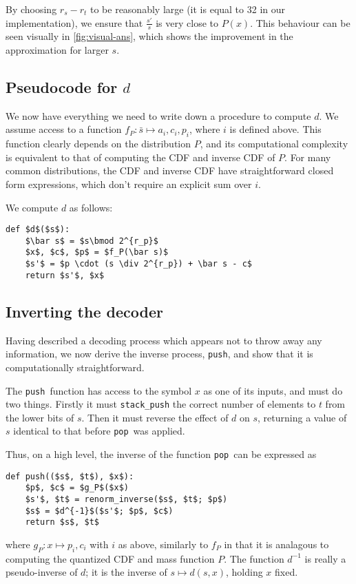 \documentclass{article}
\newcommand{\push}{\texttt{push}}
\newcommand{\pop}{\texttt{pop}}
\begin{document}
By choosing $r_s - r_t$ to be reasonably
large (it is equal to 32 in our implementation), we ensure that
$\frac{s'}{s}$ is very close to $P(x)$. This behaviour can be seen visually in
\cref{fig:visual-ans}, which shows the improvement in the approximation for
larger $s$.

\subsection{Pseudocode for $d$}
We now have everything we need to write down a procedure to compute $d$. We
assume access to a function $f_P:\bar{s}\mapsto a_i, c_i, p_i$, where $i$ is
defined above. This function clearly depends on the distribution $P$, and its
computational complexity is equivalent to that of computing the CDF and inverse
CDF of $P$. For many common distributions, the CDF and inverse CDF have
straightforward closed form expressions, which don't require an explicit sum
over $i$.

We compute $d$ as follows:
\begin{lstlisting}
def $d$($s$):
    $\bar s$ = $s\bmod 2^{r_p}$
    $x$, $c$, $p$ = $f_P(\bar s)$
    $s'$ = $p \cdot (s \div 2^{r_p}) + \bar s - c$
    return $s'$, $x$
\end{lstlisting}

\subsection{Inverting the decoder}
Having described a decoding process which appears not to throw away any
information, we now derive the inverse process, \push, and show that it is
computationally straightforward.

The \push\ function has access to the symbol $x$ as one of its inputs, and must
do two things. Firstly it must \texttt{stack\_push} the correct number of
elements to $t$ from the lower bits of $s$. Then it must reverse the effect of
$d$ on $s$, returning a value of $s$ identical to that before \pop\ was
applied.

Thus, on a high level, the inverse of the function \pop\ can be expressed as
\begin{lstlisting}
def push(($s$, $t$), $x$):
    $p$, $c$ = $g_P$($x$)
    $s'$, $t$ = renorm_inverse($s$, $t$; $p$)
    $s$ = $d^{-1}$($s'$; $p$, $c$)
    return $s$, $t$
\end{lstlisting}
where $g_P:x\mapsto p_i, c_i$ with $i$ as above, similarly to $f_P$ in that it
is analagous to computing the quantized CDF and mass function $P$. The function
$d^{-1}$ is really a pseudo-inverse of $d$; it is the inverse of $s\mapsto
d(s, x)$, holding $x$ fixed.
\end{document}
